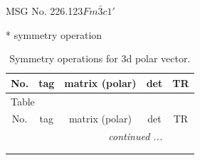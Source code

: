 \documentclass[fleqn,8pt]{jsarticle}
\begin{document}
\setcounter{MaxMatrixCols}{32}

\renewcommand{\tablename}{Table~}
\renewcommand{\figurename}{Figure~}
\begin{center}
\LARGE
MSG No. 226.123\quad$Fm\bar{3}c1'$
\end{center}
* symmetry operation
\renewcommand{\arraystretch}{1.3}
\begin{longtable}{ccccc}
\caption{Symmetry operations for 3d polar vector.}
 \\
 \hline \hline
No. & tag & matrix (polar) & det & TR \\ \hline \endfirsthead

\multicolumn{4}{l}{\tablename\ \thetable{}} \\
 \hline \hline
No. & tag & matrix (polar) & det & TR \\ \hline \endhead

 \hline \hline
\multicolumn{4}{r}{\footnotesize\it continued ...} \\ \endfoot

 \hline \hline
\multicolumn{4}{r}{} \\ \endlastfoot


\end{longtable}
\end{document}
